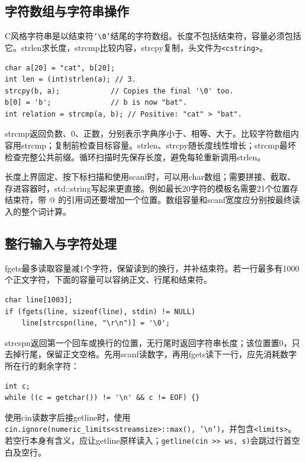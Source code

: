 \documentclass[UTF8,11pt,a4paper,fontset=none]{ctexart}
\begin{document}
\subsection{字符数组与字符串操作}
C风格字符串是以结束符\texttt{'\textbackslash0'}结尾的字符数组。长度不包括结束符，容量必须包括它。strlen求长度，strcmp比较内容，strcpy复制，头文件为\texttt{<cstring>}。
\par\noindent\begin{minipage}{\linewidth}
\begin{lstlisting}
char a[20] = "cat", b[20];
int len = (int)strlen(a); // 3.
strcpy(b, a);            // Copies the final '\0' too.
b[0] = 'b';              // b is now "bat".
int relation = strcmp(a, b); // Positive: "cat" > "bat".
\end{lstlisting}
\end{minipage}\par
strcmp返回负数、0、正数，分别表示字典序小于、相等、大于。比较字符数组内容用strcmp；复制前检查目标容量。strlen、strcpy随长度线性增长；strcmp最坏检查完整公共前缀。循环扫描时先保存长度，避免每轮重新调用strlen。

长度上界固定、按下标扫描和使用scanf时，可以用char数组；需要拼接、截取、存进容器时，std::string写起来更直接。例如最长20字符的模板名需要21个位置存结束符，带 @ 的引用词还要增加一个位置。数组容量和scanf宽度应分别按最终读入的整个词计算。

\subsection{整行输入与字符处理}
fgets最多读取容量减1个字符，保留读到的换行，并补结束符。若一行最多有1000个正文字符，下面的容量可以容纳正文、行尾和结束符。
\par\noindent\begin{minipage}{\linewidth}
\begin{lstlisting}
char line[1003];
if (fgets(line, sizeof(line), stdin) != NULL)
    line[strcspn(line, "\r\n")] = '\0';
\end{lstlisting}
\end{minipage}\par
strcspn返回第一个回车或换行的位置，无行尾时返回字符串长度；该位置置0，只去掉行尾，保留正文空格。先用scanf读数字，再用fgets读下一行，应先消耗数字所在行的剩余字符：
\par\noindent\begin{minipage}{\linewidth}
\begin{lstlisting}
int c;
while ((c = getchar()) != '\n' && c != EOF) {}
\end{lstlisting}
\end{minipage}\par
使用cin读数字后接getline时，使用\texttt{cin.ignore(numeric\_limits<streamsize>::max(), '\textbackslash n')}，并包含\texttt{<limits>}。若空行本身有含义，应让getline原样读入；\texttt{getline(cin >> ws, s)}会跳过行首空白及空行。
\end{document}
